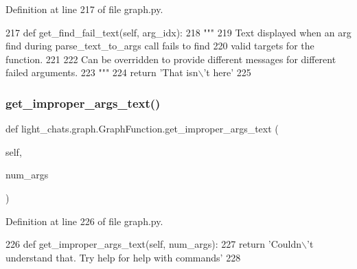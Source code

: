 Definition at line 217 of file graph.\+py.


\begin{DoxyCode}
217     \textcolor{keyword}{def }get\_find\_fail\_text(self, arg\_idx):
218         \textcolor{stringliteral}{"""}
219 \textcolor{stringliteral}{        Text displayed when an arg find during parse\_text\_to\_args call fails to find}
220 \textcolor{stringliteral}{        valid targets for the function.}
221 \textcolor{stringliteral}{}
222 \textcolor{stringliteral}{        Can be overridden to provide different messages for different failed arguments.}
223 \textcolor{stringliteral}{        """}
224         \textcolor{keywordflow}{return} \textcolor{stringliteral}{'That isn\(\backslash\)'t here'}
225 
\end{DoxyCode}
\mbox{\label{classlight__chats_1_1graph_1_1GraphFunction_a4ffab7ed0e956a6bc76e3f61818ab5ff}} 
\subsubsection{\texorpdfstring{get\+\_\+improper\+\_\+args\+\_\+text()}{get\_improper\_args\_text()}}
{\footnotesize\ttfamily def light\+\_\+chats.\+graph.\+Graph\+Function.\+get\+\_\+improper\+\_\+args\+\_\+text (\begin{DoxyParamCaption}\item[{}]{self,  }\item[{}]{num\+\_\+args }\end{DoxyParamCaption})}



Definition at line 226 of file graph.\+py.


\begin{DoxyCode}
226     \textcolor{keyword}{def }get\_improper\_args\_text(self, num\_args):
227         \textcolor{keywordflow}{return} \textcolor{stringliteral}{'Couldn\(\backslash\)'t understand that. Try help for help with commands'}
228 
\end{DoxyCode}
\mbox{\label{classlight__chats_1_1graph_1_1GraphFunction_a6fb123ff0ec87dde23a5ce8a1614bbbe}} 
